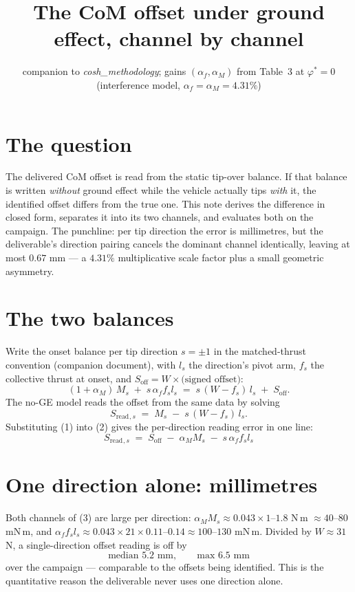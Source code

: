 \documentclass[10pt]{article}
\title{\vspace{-16mm}\textbf{The CoM offset under ground effect,
channel by channel}\vspace{-3mm}}
\date{\small companion to \emph{cosh\_methodology}; gains
$(\alpha_f, \alpha_M)$ from Table~3 at $\varphi^\ast = 0$
(interference model, $\alpha_f = \alpha_M = 4.31\%$)}
\newcommand{\Soff}{S_{\mathrm{off}}}
\newcommand{\Sread}{S_{\mathrm{read}}}
\begin{document}
\maketitle

\section{The question}

The delivered CoM offset is read from the static tip-over balance.
If that balance is written \emph{without} ground effect while the
vehicle actually tips \emph{with} it, the identified offset differs
from the true one. This note derives the difference in closed form,
separates it into its two channels, and evaluates both on the
campaign. The punchline: per tip direction the error is
millimetres, but the deliverable's direction pairing cancels the
dominant channel identically, leaving at most $0.67$ mm --- a
$4.31\%$ multiplicative scale factor plus a small geometric
asymmetry.

\section{The two balances}

Write the onset balance per tip direction $s = \pm 1$ in the
matched-thrust convention (companion document), with $l_s$ the
direction's pivot arm, $f_s$ the collective thrust at onset, and
$\Soff = W \times \text{(signed offset)}$:
\begin{equation}
  (1+\alpha_M)\,M_s \;+\; s\,\alpha_f f_s l_s
  \;=\; s\,(W - f_s)\,l_s \;+\; \Soff .
  \tag{1}
\end{equation}
The no-GE model reads the offset from the same data by solving
\begin{equation}
  \Sread{}_{,s} \;=\; M_s \;-\; s\,(W - f_s)\,l_s .
  \tag{2}
\end{equation}
Substituting (1) into (2) gives the per-direction reading error in
one line:
\begin{equation}
  \boxed{\;\Sread{}_{,s} \;=\; \Soff
  \;-\; \alpha_M M_s \;-\; s\,\alpha_f f_s l_s \;}
  \tag{3}
\end{equation}

\section{One direction alone: millimetres}

Both channels of (3) are large per direction: $\alpha_M M_s \approx
0.043 \times 1$--$1.8$ N\,m $\approx 40$--$80$ mN\,m, and
$\alpha_f f_s l_s \approx 0.043 \times 21 \times 0.11$--$0.14
\approx 100$--$130$ mN\,m. Divided by $W \approx 31$ N, a
single-direction offset reading is off by
\begin{equation*}
  \text{median } 5.2 \text{ mm}, \qquad \text{max } 6.5 \text{ mm}
\end{equation*}
over the campaign --- comparable to the offsets being identified.
This is the quantitative reason the deliverable never uses one
direction alone.
\end{document}
